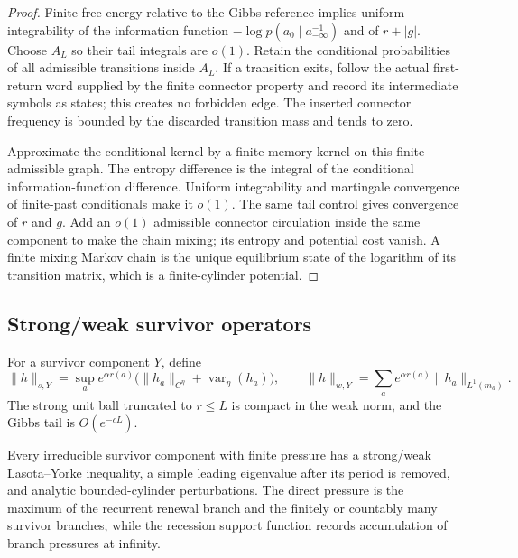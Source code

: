 \begin{proof}
Finite free energy relative to the Gibbs reference implies uniform
integrability of the information function
\(-\log p(a_0\mid a_{-\infty}^{-1})\) and of \(r+|g|\).  Choose \(A_L\) so
their tail integrals are \(o(1)\).  Retain the conditional probabilities of
all admissible transitions inside \(A_L\).  If a transition exits, follow the
actual first-return word supplied by the finite connector property and record
its intermediate symbols as states; this creates no forbidden edge.  The
inserted connector frequency is bounded by the discarded transition mass and
tends to zero.

Approximate the conditional kernel by a finite-memory kernel on this finite
admissible graph.  The entropy difference is the integral of the conditional
information-function difference.  Uniform integrability and martingale
convergence of finite-past conditionals make it \(o(1)\).  The same tail
control gives convergence of \(r\) and \(g\).  Add an \(o(1)\) admissible
connector circulation inside the same component to make the chain mixing;
its entropy and potential cost vanish.  A finite mixing Markov chain is the
unique equilibrium state of the logarithm of its transition matrix, which is
a finite-cylinder potential.
\end{proof}

\subsection{Strong/weak survivor operators}

For a survivor component \(Y\), define
\[
\|h\|_{s,Y}=\sup_a e^{\alpha r(a)}
\bigl(\|h_a\|_{C^\eta}+\operatorname{var}_\eta(h_a)\bigr),
\qquad
\|h\|_{w,Y}=\sum_a e^{\alpha r(a)}
\|h_a\|_{L^1(m_a)}.
\]
The strong unit ball truncated to \(r\le L\) is compact in the weak norm, and
the Gibbs tail is \(O(e^{-cL})\).

\begin{theorem}
\label{thm:r6-a3-survivor}
Every irreducible survivor component with finite pressure has a strong/weak
Lasota--Yorke inequality, a simple leading eigenvalue after its period is
removed, and analytic bounded-cylinder perturbations.  The direct pressure is
the maximum of the recurrent renewal branch and the finitely or countably many
survivor branches, while the recession support function records accumulation
of branch pressures at infinity.
\end{theorem}

